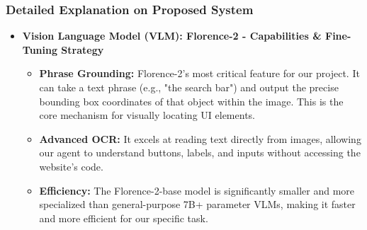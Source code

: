 
\begin{frame}
\frametitle{ Detailed Explanation on Proposed System}

\begin{itemize}
    \item \textbf{Vision Language Model (VLM): Florence-2 - Capabilities \& Fine-Tuning Strategy}
    
    \vspace{0.3cm}
    
    \begin{itemize}
        \item \textbf{Phrase Grounding:} Florence-2's most critical feature for our project. It can take a text phrase (e.g., "the search bar") and output the precise bounding box coordinates of that object within the image. This is the core mechanism for visually locating UI elements.
        
        \vspace{0.25cm}
        
        \item \textbf{Advanced OCR:} It excels at reading text directly from images, allowing our agent to understand buttons, labels, and inputs without accessing the website's code.
        
        \vspace{0.25cm}
        
        \item \textbf{Efficiency:} The Florence-2-base model is significantly smaller and more specialized than general-purpose 7B+ parameter VLMs, making it faster and more efficient for our specific task.
    \end{itemize}

\end{itemize}

\end{frame}